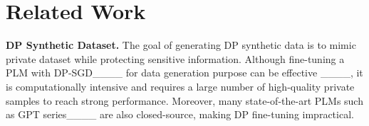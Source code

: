 \section{Related Work}

\textbf{DP Synthetic Dataset.} 
The goal of generating DP synthetic data is to mimic private dataset while protecting sensitive information. %
Although fine-tuning a PLM with DP-SGD____ for data generation purpose can be effective%
____, it 
is computationally intensive and requires a large number of high-quality private samples to reach strong performance.
Moreover, many state-of-the-art PLMs such as GPT series____ are also closed-source, making DP fine-tuning impractical.

